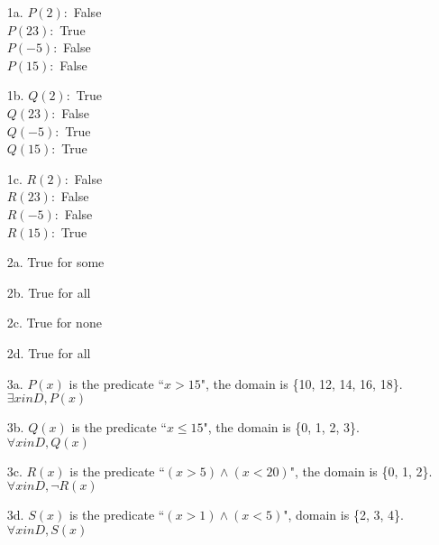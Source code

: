 {}{

\begin{enumerate}
    \item[1a.]      $P(2):$  False  \\
                    $P(23):$ True   \\
                    $P(-5):$ False  \\
                    $P(15):$ False

    \item[1b.]      $Q(2):$  True   \\
                    $Q(23):$ False  \\
                    $Q(-5):$ True   \\
                    $Q(15):$ True   \\

    \item[1c.]      $R(2):$  False  \\
                    $R(23):$ False  \\
                    $R(-5):$ False  \\
                    $R(15):$ True

    \item[2a.]      True for some
    \item[2b.]      True for all
    \item[2c.]      True for none
    \item[2d.]      True for all

    \item[3a.]      $P(x)$ is the predicate ``$x > 15$", the domain is \{10, 12, 14, 16, 18\}. \\
                    $\exists x in D, P(x)$

    \item[3b.]      $Q(x)$ is the predicate ``$x \leq 15$", the domain is \{0, 1, 2, 3\}. \\
                    $\forall x in D, Q(x)$
    
    \item[3c.]      $R(x)$ is the predicate ``$(x > 5) \land (x < 20)$", the domain is \{0, 1, 2\}. \\
                    $\forall x in D, \neg R(x)$
    
    \item[3d.]      $S(x)$ is the predicate ``$(x > 1) \land (x < 5)$", domain is \{2, 3, 4\}. \\
                    $\forall x in D, S(x)$


\end{enumerate}}
